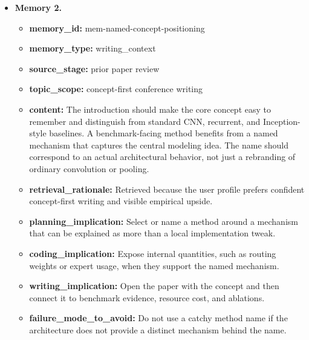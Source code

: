 \documentclass{opendatalab}
\begin{document}
\begin{tcolorbox}
\begin{itemize}
  \item \textbf{Memory 2.}
  \begin{itemize}\setlength\itemsep{1pt}
    \item \textbf{memory\_id:} mem-named-concept-positioning
    \item \textbf{memory\_type:} writing\_context
    \item \textbf{source\_stage:} prior paper review
    \item \textbf{topic\_scope:} concept-first conference writing
    \item \textbf{content:} The introduction should make the core concept easy to remember and distinguish from standard CNN, recurrent, and Inception-style baselines. A benchmark-facing method benefits from a named mechanism that captures the central modeling idea. The name should correspond to an actual architectural behavior, not just a rebranding of ordinary convolution or pooling.
    \item \textbf{retrieval\_rationale:} Retrieved because the user profile prefers confident concept-first writing and visible empirical upside.
    \item \textbf{planning\_implication:} Select or name a method around a mechanism that can be explained as more than a local implementation tweak.
    \item \textbf{coding\_implication:} Expose internal quantities, such as routing weights or expert usage, when they support the named mechanism.
    \item \textbf{writing\_implication:} Open the paper with the concept and then connect it to benchmark evidence, resource cost, and ablations.
    \item \textbf{failure\_mode\_to\_avoid:} Do not use a catchy method name if the architecture does not provide a distinct mechanism behind the name.
  \end{itemize}


\end{itemize}
\end{tcolorbox}
\end{document}
